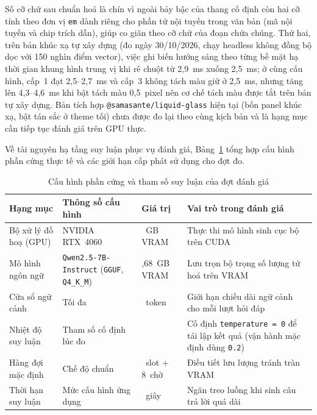 Số cỡ chữ sau chuẩn hoá là chín vì ngoài bảy bậc của thang cố định còn hai cỡ tính theo đơn vị \texttt{em} dành riêng cho phần tử nội tuyến trong văn bản (mã nội tuyến và chip trích dẫn), giúp co giãn theo cỡ chữ của đoạn chứa chúng. Thứ hai, trên bản khúc xạ tự xây dựng (đo ngày 30/10/2026, chạy headless không đồng bộ dọc với 150 nghìn điểm vector), việc ghi biến hướng sáng theo từng bề mặt hạ thời gian khung hình trung vị khi rê chuột từ 2,9~ms xuống 2,5~ms; ở cùng cấu hình, cấp~1 đạt 2,5--2,7~ms và cấp~3 không tách màu giữ ở 2,5~ms, nhưng tăng lên 4,3--4,6~ms khi bật tách màu 0,5~pixel nên cơ chế tách màu được tắt trên bản tự xây dựng. Bản tích hợp \texttt{@samasante/liquid-glass} hiện tại (bốn panel khúc xạ, bật tán sắc ở theme tối) chưa được đo lại theo cùng kịch bản và là hạng mục cần tiếp tục đánh giá trên GPU thực.

Về tài nguyên hạ tầng suy luận phục vụ đánh giá, Bảng~\ref{tab:cau-hinh-phan-cung-ai-ch6} tổng hợp cấu hình phần cứng thực tế và các giới hạn cấp phát sử dụng cho đợt đo.

\begin{table}[htbp]
\centering
\caption{Cấu hình phần cứng và tham số suy luận của đợt đánh giá}
\label{tab:cau-hinh-phan-cung-ai-ch6}
\small
\begin{tabularx}{\textwidth}{
  >{\raggedright\arraybackslash}p{3.2cm}
  >{\raggedright\arraybackslash}p{3.8cm}
  >{\raggedleft\arraybackslash}p{2.1cm}
  >{\raggedright\arraybackslash}X
}
\toprule
\textbf{Hạng mục} & \textbf{Thông số cấu hình} & \textbf{Giá trị} & \textbf{Vai trò trong đánh giá} \\
\midrule
Bộ xử lý đồ hoạ (GPU) & NVIDIA RTX~4060 & 8~GB VRAM & Thực thi mô hình sinh cục bộ trên CUDA \\
\midrule
Mô hình ngôn ngữ & \texttt{Qwen2.5-\allowbreak{}7B-\allowbreak{}Instruct} (\texttt{GGUF}, \texttt{Q4\_\allowbreak{}K\_\allowbreak{}M}) & 4,68~GB VRAM & Lưu trọn bộ trọng số lượng tử hoá trên VRAM \\
\midrule
Cửa sổ ngữ cảnh & Tối đa & 8.192~token & Giới hạn chiều dài ngữ cảnh cho mỗi lượt hỏi đáp \\
\midrule
Nhiệt độ suy luận & Tham số cố định lúc đo & 0 & Cố định \texttt{temperature = 0} để tái lập kết quả (vận hành mặc định dùng \texttt{0.2}) \\
\midrule
Hàng đợi mặc định & Chế độ chuẩn & 1~slot + 8~chờ & Điều tiết lưu lượng tránh tràn VRAM \\
\midrule
Thời hạn suy luận & Mức cấu hình ứng dụng & 60~giây & Ngăn treo luồng khi sinh câu trả lời quá dài \\
\bottomrule
\end{tabularx}
\end{table}

